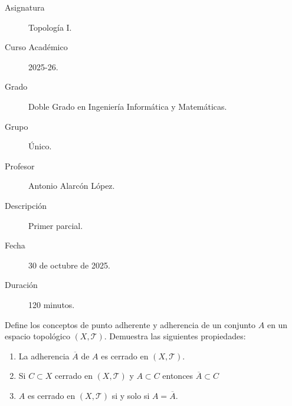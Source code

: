 \documentclass[12pt]{article}
\begin{document}

    
    

    \begin{description}
        \item[Asignatura] Topología I.
        \item[Curso Académico] 2025-26.
        \item[Grado] Doble Grado en Ingeniería Informática y Matemáticas.
        \item[Grupo] Único.
        \item[Profesor] Antonio Alarcón López.
        \item[Descripción] Primer parcial.
        \item[Fecha] 30 de octubre de 2025.
        \item[Duración] 120 minutos.
    \end{description}
    
    \newpage
    
    \begin{ejercicio}[1 punto] Define los conceptos de punto adherente y adherencia de un conjunto $A$ en un espacio topológico $(X,\mathcal{T})$. Demuestra las siguientes propiedades:
        \begin{enumerate}[label=(\alph*)]
            \item La adherencia $\overline{A}$ de $A$ es cerrado en $(X,\mathcal{T})$.
            \item Si $C\subset X$ cerrado en $(X,\mathcal{T})$ y $A\subset C$ entonces $\overline{A}\subset C$
            \item $A$ es cerrado en $(X,\mathcal{T})$ si y solo si $A=\overline{A}.$
        \end{enumerate}
    \end{ejercicio}
    
\end{document}
